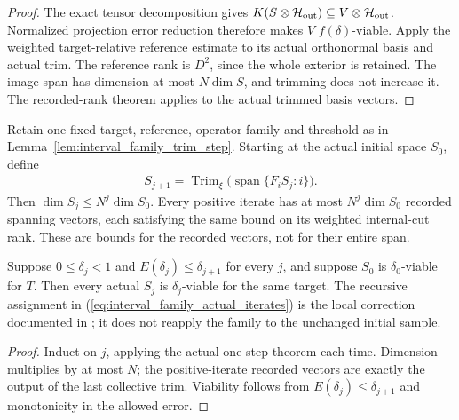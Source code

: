 \begin{proof}\leanok
    The exact tensor decomposition gives
    $K(S\otimes\mathcal H_{\rm out})\subseteq
        V\otimes\mathcal H_{\rm out}$.
    Normalized projection error reduction therefore makes $V$
    $f(\delta)$-viable. Apply the weighted target-relative reference
    estimate to its actual orthonormal basis and actual trim. The reference
    rank is $D^2$, since the whole exterior is retained. The image span
    has dimension at most $N\dim S$, and trimming does not increase it.
    The recorded-rank theorem applies to the actual trimmed basis vectors.
\end{proof}

\begin{lemma}
    \label{lem:interval_family_trim_iterates}
    \leanok
    Retain one fixed target, reference, operator family and threshold as
    in Lemma~\ref{lem:interval_family_trim_step}. Starting at the actual
    initial space $S_0$, define
    \begin{align}
        S_{j+1}=\operatorname{Trim}_{\xi}
        \bigl(\operatorname{span}\{F_iS_j:i\}\bigr).
        \label{eq:interval_family_actual_iterates}
    \end{align}
    Then $\dim S_j\le N^j\dim S_0$. Every positive iterate has at most
    $N^j\dim S_0$ recorded spanning vectors, each satisfying the same
    bound on its weighted internal-cut rank. These are bounds for the
    recorded vectors, not for their entire span.

    Suppose $0\le\delta_j<1$ and $E(\delta_j)\le\delta_{j+1}$ for every
    $j$, and suppose $S_0$ is $\delta_0$-viable for $T$. Then every actual
    $S_j$ is $\delta_j$-viable for the same target.
    The recursive assignment in (\ref{eq:interval_family_actual_iterates})
    is the local correction documented in
    \cite{gap:alvv16_approximation_parameters}; it does not reapply the
    family to the unchanged initial sample.
\end{lemma}
\begin{proof}\leanok
    Induct on $j$, applying the actual one-step theorem each time.
    Dimension multiplies by at most $N$; the positive-iterate recorded
    vectors are exactly the output of the last collective trim.
    Viability follows from $E(\delta_j)\le\delta_{j+1}$ and monotonicity
    in the allowed error.
\end{proof}

